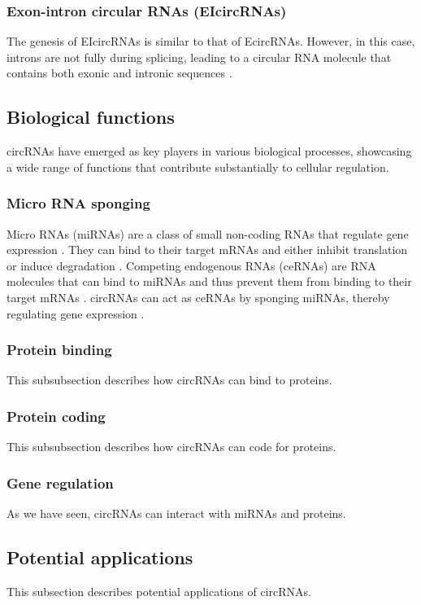 \subsubsection{Exon-intron circular RNAs (EIcircRNAs)}
The genesis of EIcircRNAs is similar to that of EcircRNAs.
However, in this case, introns are not fully during splicing,
leading to a circular RNA molecule that contains both exonic and intronic sequences \supercite{xiao_circular_2022}.

\subsection{Biological functions}
circRNAs have emerged as key players in various biological processes,
showcasing a wide range of functions that contribute substantially to cellular regulation. 

\subsubsection{Micro RNA sponging}
Micro RNAs (miRNAs) are a class of small non-coding RNAs that regulate gene expression \supercite{bartel_micrornas_2009}.
They can bind to their target mRNAs and either inhibit translation or induce degradation \supercite{bartel_micrornas_2009}.
Competing endogenous RNAs (ceRNAs) are RNA molecules that can bind to miRNAs and thus prevent them from binding to their target mRNAs \supercite{tay_multilayered_2014}.
circRNAs can act as ceRNAs by sponging miRNAs, thereby regulating gene expression \supercite{xiao_circular_2022}.

\subsubsection{Protein binding}
This subsubsection describes how circRNAs can bind to proteins.

\subsubsection{Protein coding}
This subsubsection describes how circRNAs can code for proteins.

\subsubsection{Gene regulation}
As we have seen, circRNAs can interact with miRNAs and proteins.

\subsection{Potential applications}
This subsection describes potential applications of circRNAs.

